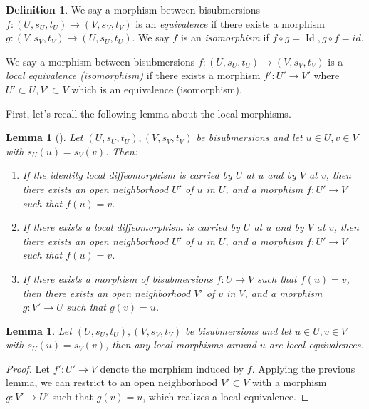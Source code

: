 \documentclass[12pt]{amsart}
\newtheorem{lem}[thm]{Lemma}
\theoremstyle{definition}
\newtheorem{defn}[thm]{Definition}
\theoremstyle{remark}
\numberwithin{equation}{section}
\newcommand{\1}{{\mathbb{1}}}
\newcommand{\id}{\operatorname{Id}}
\begin{document}
\begin{defn}
    We say a morphism between bisubmersions $f: (U, s_U, t_U)\to (V, s_V, t_V)$ is an {\it equivalence} if there exists a morphism $g:(V, s_V, t_V)\to (U, s_U, t_U)$. We say $f$ is an {\it isomorphism}  if $f\circ g = \id, g\circ f = id$.
    
    We say a morphism between bisubmersions $f: (U, s_U, t_U)\to (V, s_V, t_V)$ is a {\it local equivalence (isomorphism)} if there exists a morphism $f': U'\to V'$ where $U'\subset U, V'\subset V$ which is an equivalence (isomorphism).
\end{defn}
First, let's recall the following lemma about the local morphisms.
\begin{lem}[\cite{AS06}]
    Let $(U, s_U, t_U), (V, s_V, t_V)$ be bisubmersions and let $u\in U, v\in V$ with $s_U(u) = s_V(v)$. Then:
    \begin{enumerate}
        \item If the identity local diffeomorphism is carried by $U$ at $u$ and by $V$ at $v$, then there exists an open neighborhood $U'$ of $u$ in $U$, and a morphism $f: U' \to V$ such that $f(u) = v$.
        \item If there exists a local diffeomorphism is carried by $U$ at $u$ and by $V$ at $v$, then there exists an open neighborhood $U'$ of $u$ in $U$, and a morphism $f: U' \to V$ such that $f(u) = v$.
        \item If there exists a morphism of bisubmersions $f:U \to V$ such that $f(u) = v$, then there exists an open neighborhood $V'$ of $v$ in $V$, and a morphism $g: V' \to U$ such that $g(v) = u$.
    \end{enumerate}
\end{lem}
\begin{lem}Let $(U, s_U, t_U), (V, s_V, t_V)$ be bisubmersions and let $u\in U, v\in V$ with $s_U(u) = s_V(v)$, then any local morphisms around $u$ are local equivalences.
\end{lem}
\begin{proof}
    Let $f': U'\to V$ denote the morphism induced by $f$. Applying the previous lemma, we can restrict to an open neighborhood  $V'\subset V$ with a morphism $g: V'\to U'$ such that $g(v) = u$, which realizes a local equivalence.
\end{proof}
\end{document}
